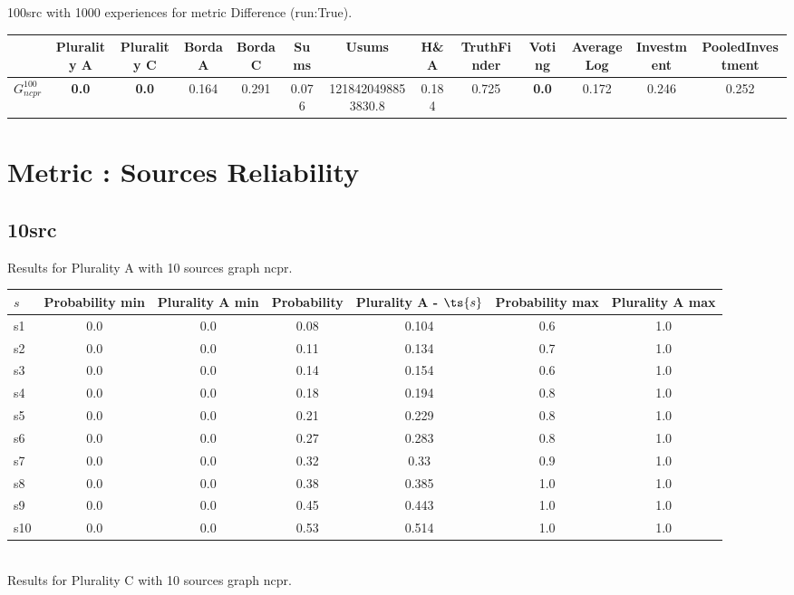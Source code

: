 \documentclass{article}
\newcommand{\graph}[2]{$G_{#1}^{#2}$}
\begin{document}
100src with 1000 experiences for metric Difference (run:True).

\noindent\begin{tabular}{|l|c|c|c|c|c|c|c|c|c|c|c|c|}
\hline
& Plurality A& Plurality C& Borda A& Borda C& Sums& Usums& H\&A& TruthFinder& Voting& AverageLog& Investment& PooledInvestment\\
\hline
\graph{ncpr}{100} &\textbf{0.0}&\textbf{0.0}&0.164&0.291&0.076&1218420498853830.8&0.184&0.725&\textbf{0.0}&0.172&0.246&0.252\\
\hline
\end{tabular}
\newpage
\newpage
\section{Metric : Sources Reliability}

\newpage
\newpage

\subsection{10src}

\noindent Results for Plurality A with 10 sources graph ncpr.

\noindent\begin{tabular}{|l|c|c|c|c|c|c|}
\hline
$s$& Probability min & Plurality A min & Probability & Plurality A - $\ts{s}$ & Probability max & Plurality A max\\
\hline
s1 &0.0 & 0.0 & 0.08 & 0.104 & 0.6 & 1.0\\
\hline
s2 &0.0 & 0.0 & 0.11 & 0.134 & 0.7 & 1.0\\
\hline
s3 &0.0 & 0.0 & 0.14 & 0.154 & 0.6 & 1.0\\
\hline
s4 &0.0 & 0.0 & 0.18 & 0.194 & 0.8 & 1.0\\
\hline
s5 &0.0 & 0.0 & 0.21 & 0.229 & 0.8 & 1.0\\
\hline
s6 &0.0 & 0.0 & 0.27 & 0.283 & 0.8 & 1.0\\
\hline
s7 &0.0 & 0.0 & 0.32 & 0.33 & 0.9 & 1.0\\
\hline
s8 &0.0 & 0.0 & 0.38 & 0.385 & 1.0 & 1.0\\
\hline
s9 &0.0 & 0.0 & 0.45 & 0.443 & 1.0 & 1.0\\
\hline
s10 &0.0 & 0.0 & 0.53 & 0.514 & 1.0 & 1.0\\
\hline
\end{tabular}\\

\noindent Results for Plurality C with 10 sources graph ncpr.
\end{document}
